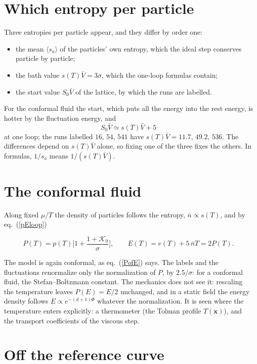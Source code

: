 \documentclass[11pt,aps,preprint,nofootinbib,superscriptaddress,tightenlines]{revtex4-2}
\newcommand{\avg}[1]{\langle #1\rangle}
\def\st{\begin{equation}}
\def\stp{\end{equation}}
\def\Eq#1{eq.~(\ref{#1})}
\begin{document}
\section{Which entropy per particle}
\label{sec:whichs}

Three entropies per particle appear, and they differ by order one:
\begin{itemize}
\item the mean $\avg{s_a}$ of the particles' own entropy, which the ideal step conserves particle by particle;
\item the bath value $s(T)\bar V=3\sigma$, which the one-loop formulas contain;
\item the start value $S_0\bar V$ of the lattice, by which the runs are labelled.
\end{itemize}
For the conformal fluid the start, which puts all the energy into the rest energy, is hotter by the fluctuation energy, and
\st
S_0\bar V\simeq s(T)\bar V+5
\stp
at one loop; the runs labelled $16$, $54$, $541$ have $s(T)\bar V=11.7$, $49.2$, $536$.  The differences depend on $s(T)\bar V$ alone, so fixing one of the three fixes
the others.  In formulas, $1/s_a$ means $1/(s(T)\bar V)$.

\section{The conformal fluid}
\label{sec:conformal}

Along fixed $\mu/T$ the density of particles follows the entropy, $\bar n\propto s(T)$, and by \Eq{pEloop}
\begin{keyeq}
\st
P(T)=p(T)\Big[1+\frac{1+\mathcal K_0}\sigma\Big],\qquad E(T)=e(T)+5\,\bar nT=2P(T) .
\label{Pconf}
\stp
\end{keyeq}
The model is again conformal, as \Eq{PofE} says.  The labels and the fluctuations renormalize only the normalization of $P$, by $2.5/\sigma$: for a
conformal fluid, the Stefan--Boltzmann constant.  The mechanics does not see it: rescaling the temperature leaves $P(E)=E/2$ unchanged, and in a static field
the energy density follows $E\propto e^{-(d+1)\Phi}$ whatever the normalization.  It is seen where the temperature enters explicitly: a thermometer (the
Tolman profile $T(\bm x)$), and the transport coefficients of the viscous step.

\section{Off the reference curve}
\label{sec:offcurve}
\end{document}

